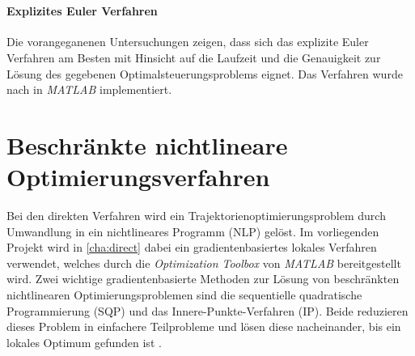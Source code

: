 \begin{figure}[htbp]
    \centering 
    \qquad
     \\

    \qquad
\end{figure}


\paragraph{Explizites Euler Verfahren}
Die vorangeganenen Untersuchungen zeigen, dass sich das explizite Euler Verfahren am Besten mit Hinsicht auf die Laufzeit und die Genauigkeit zur Lösung des gegebenen Optimalsteuerungsproblems eignet. Das Verfahren wurde nach \cite{Brokate2016} in \textit{MATLAB} implementiert.

\section{Beschränkte nichtlineare Optimierungsverfahren}
Bei den direkten Verfahren wird ein Trajektorienoptimierungsproblem durch Umwandlung in ein nichtlineares Programm (NLP) gelöst. Im vorliegenden Projekt wird in \autoref{cha:direct} dabei ein gradientenbasiertes lokales Verfahren verwendet, welches durch die \textit{Optimization Toolbox} von \textit{MATLAB} bereitgestellt wird. Zwei wichtige gradientenbasierte Methoden zur Lösung von beschränkten nichtlinearen Optimierungsproblemen sind die sequentielle quadratische Programmierung (SQP) und das Innere-Punkte-Verfahren (IP). Beide reduzieren dieses Problem in einfachere Teilprobleme und lösen diese nacheinander, bis ein lokales Optimum gefunden ist \cite{Betts2010}.

